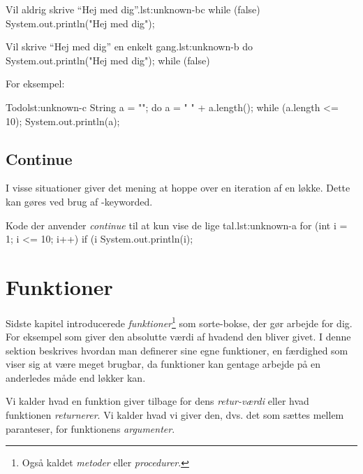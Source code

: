 		\begin{JavaCode}{Vil aldrig skrive ``Hej med dig''.}{lst:unknown-bc}
			while (false) {
				System.out.println("Hej med dig");
			}
		\end{JavaCode}

		\begin{JavaCode}{Vil skrive ``Hej med dig'' en enkelt gang.}{lst:unknown-b}
			do {
				System.out.println("Hej med dig");
			} while (false)
		\end{JavaCode}

		For eksempel:

		\begin{JavaCode}{Todo}{lst:unknown-c}
			String a = "";
			do {
				a = " " + a.length();
			} while (a.length <= 10);
			System.out.println(a);
		\end{JavaCode}


	\subsection{Continue}

		I visse situationer giver det mening at hoppe over en iteration af en
		løkke. Dette kan gøres ved brug af -keyworded.

		\begin{JavaCode}{Kode der anvender \emph{continue} til at kun vise de lige tal.}{lst:unknown-a}
			for (int i = 1; i <= 10; i++) {
				if (i %
				System.out.println(i);
			}
		\end{JavaCode}



\section{Funktioner}

	Sidste kapitel introducerede \emph{funktioner}\footnote{Også kaldet \emph{metoder} eller \emph{procedurer}.}
	som sorte-bokse, der gør arbejde for dig. For eksempel 
	som giver den absolutte værdi af hvadend den bliver givet. I denne sektion
	beskrives hvordan man definerer sine egne funktioner, en færdighed som viser
	sig at være meget brugbar, da funktioner kan gentage arbejde på en
	anderledes måde end løkker kan.

	Vi kalder hvad en funktion giver tilbage for dens \emph{retur-værdi} eller
	hvad funktionen \emph{returnerer}. Vi kalder hvad vi giver den, dvs. det som
	sættes mellem paranteser, for funktionens \emph{argumenter}.

